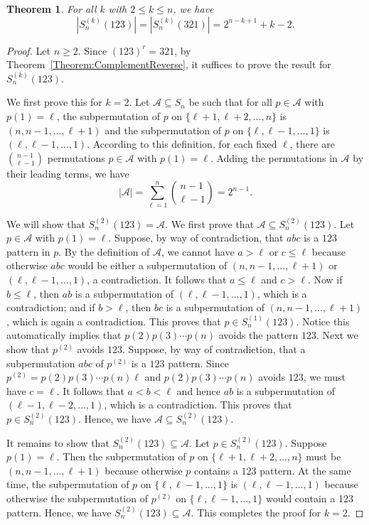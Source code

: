 \documentclass[10pt,a4paper]{amsart}
\newtheorem{theorem}{Theorem}[section]
\numberwithin{equation}{section}
\begin{document}
\begin{theorem}\label{Theorem:MonotonePatterns}
    For all $k$ with $2\leq k\leq n$, we have 
    \[
    |S_n^{(k)}(123)|=|S_n^{(k)}(321)|=2^{n-k+1}+k-2.
    \]
\end{theorem}
\begin{proof}
Let $n\geq2$. Since $(123)^r=321$, by Theorem~\ref{Theorem:ComplementReverse}, it suffices to prove the result for $S_n^{(k)}(123)$.

We first prove this for $k=2$. Let $\mathcal{A}\subseteq S_n$ be such that for all $p\in\mathcal{A}$ with $p(1)=\ell$, the subpermutation of $p$ on $\{\ell+1,\ell+2,\ldots,n\}$ is $(n,n-1,\ldots,\ell+1)$ and the subpermutation of $p$ on $\{\ell,\ell-1,\ldots,1\}$ is $(\ell,\ell-1,\ldots,1)$. 
According to this 
definition, for each fixed $\ell$, there are $\binom{n-1}{\ell-1}$ permutations $p\in\mathcal{A}$ with $p(1)=\ell$. Adding the permutations in $\mathcal{A}$ by their leading terms, we have 
\[
|\mathcal{A}|=\sum_{\ell=1}^n\binom{n-1}{\ell-1}=2^{n-1}.
\]

We will show that $S_n^{(2)}(123)=\mathcal{A}$. We first prove that $\mathcal{A}\subseteq S_n^{(2)}(123)$. Let $p\in\mathcal{A}$ with $p(1)=\ell$. 
Suppose, by way of contradiction, that $abc$ is a $123$ pattern in $p$. By the definition of $\mathcal{A}$, we cannot have $a>\ell$ or $c\leq\ell$ because otherwise $abc$ would be either a subpermutation of $(n,n-1,\ldots,\ell+1)$ or $(\ell,\ell-1,\ldots,1)$, 
a contradiction. It follows that $a\leq\ell$ and $c>\ell$. Now if $b\leq \ell$, then $ab$ is a subpermutation of $(\ell,\ell-1,\ldots,1)$, which is a contradiction; and if $b>\ell$, then $bc$ is a subpermutation of $(n,n-1,\ldots,\ell+1)$, which is again a contradiction. This proves that $p\in S_n^{(1)}(123)$. 
Notice this automatically implies that $p(2)p(3)\cdots p(n)$ avoids the pattern $123$. Next we show that $p^{(2)}$ avoids $123$. 
Suppose, by way of contradiction, that a subpermutation $abc$ of $p^{(2)}$ is a $123$ pattern. 
Since $p^{(2)}=p(2)p(3)\cdots p(n)\ell$ and $p(2)p(3)\cdots p(n)$ avoids $123$, we must have $c=\ell$. It follows that $a<b<\ell$ and hence $ab$ is a subpermutation of $(\ell-1,\ell-2,\ldots,1)$, which is a contradiction. This proves that $p \in S_n^{(2)}(123)$. Hence, we have $\mathcal{A}\subseteq S_n^{(2)}(123)$.

It remains to show that $S_n^{(2)}(123)\subseteq\mathcal{A}$. Let $p\in S_n^{(2)}(123)$. Suppose $p(1)=\ell$. Then the subpermutation of $p$ on $\{\ell+1,\ell+2,\ldots,n\}$ must be $(n,n-1,\ldots,\ell+1)$ because otherwise $p$ contains a $123$ pattern. At the same time, the subpermutation of $p$ on $\{\ell,\ell-1,\ldots,1\}$ is $(\ell,\ell-1,\ldots,1)$ because otherwise the subpermutation of $p^{(2)}$ on $\{\ell,\ell-1,\ldots,1\}$ would contain a 123 pattern. Hence, we have $S_n^{(2)}(123)\subseteq\mathcal{A}$. This completes the proof for $k=2$.


\end{proof}
\end{document}
